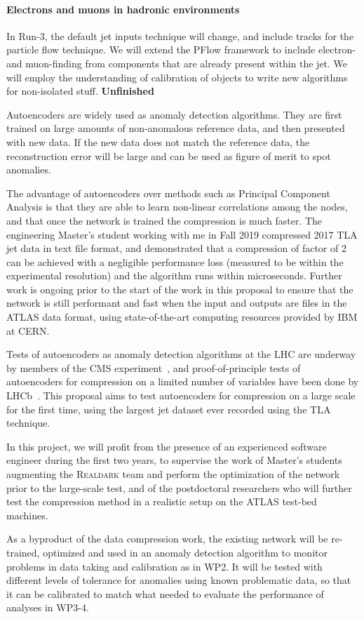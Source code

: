 \paragraph{Electrons and muons in hadronic environments}

In Run-3, the default jet inputs technique will change, and include tracks for the particle flow technique. 
We will extend the PFlow framework to include electron- and muon-finding from components that are already present within the jet. 
We will employ the understanding of calibration of objects to write new algorithms for non-isolated stuff. 
\textbf{Unfinished}




Autoencoders are widely used as anomaly detection algorithms. They are first trained on large amounts of non-anomalous reference data, and then presented with new data. If the new data does not match the reference data, the reconstruction error will be large and can be used as figure of merit to spot anomalies. 

The advantage of autoencoders over methods such as Principal Component Analysis is that they are able to learn non-linear correlations among the nodes, and that once the network is trained the compression is much faster. 
The engineering Master’s student working with me in Fall 2019 compressed 2017 TLA jet data in text file format, and demonstrated that a compression of factor of 2 can be achieved with a negligible performance loss (measured to be within the experimental resolution) and the algorithm runs within microseconds. Further work is ongoing prior to the start of the work in this proposal to ensure that the network is still performant and fast when the input and outputs are files in the ATLAS data format, using state-of-the-art computing resources provided by IBM at CERN. 

Tests of autoencoders as anomaly detection algorithms at the LHC are underway by members of the CMS experiment~\cite{CMSAE}, and proof-of-principle tests of autoencoders for compression on a limited number of variables  have been done by LHCb~\cite{ref:lhcb_ae}. 
This proposal aims to test autoencoders for compression on a large scale for the first time, using the largest jet dataset ever recorded using the TLA technique.

In this project, we will profit from the presence of an experienced software engineer during the first two years, to supervise the work of Master’s students augmenting the \textsc{Realdark} team and perform the optimization of the network prior to the large-scale test, and of the postdoctoral researchers who will further test the compression method in a realistic setup on the ATLAS test-bed machines. 

As a byproduct of the data compression work, the existing network will be re-trained, optimized and used in an anomaly detection algorithm to monitor problems in data taking and calibration as in WP2. It will be tested with different levels of tolerance for anomalies using known problematic data, so that it can be calibrated to match what needed to evaluate the performance of analyses in WP3-4. 


